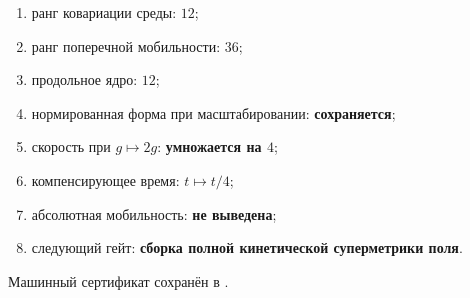\begin{protocol}
\begin{enumerate}
 \item ранг ковариации среды: \textbf{$12$};
 \item ранг поперечной мобильности: \textbf{$36$};
 \item продольное ядро: \textbf{$12$};
 \item нормированная форма при масштабировании: \textbf{сохраняется};
 \item скорость при $g\mapsto2g$: \textbf{умножается на $4$};
 \item компенсирующее время: \textbf{$t\mapsto t/4$};
 \item абсолютная мобильность: \textbf{не выведена};
 \item следующий гейт: \textbf{сборка полной кинетической суперметрики поля}.
\end{enumerate}
\end{protocol}

Машинный сертификат сохранён в
.